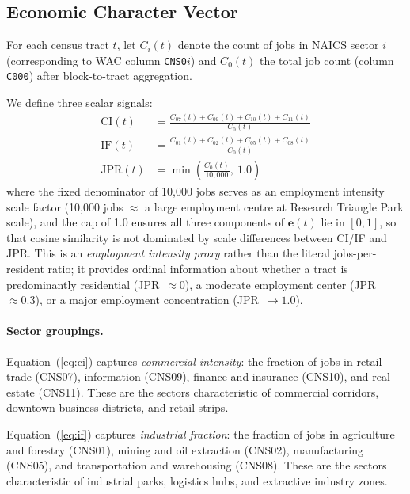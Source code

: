 \label{sec:algorithm}

\subsection{Economic Character Vector}

For each census tract $t$, let $C_{i}(t)$ denote the count of jobs in
NAICS sector $i$ (corresponding to WAC column \texttt{CNS0}$i$) and
$C_{0}(t)$ the total job count (column \texttt{C000}) after
block-to-tract aggregation.

We define three scalar signals:
\begin{align}
  \mathrm{CI}(t) &= \frac{C_{07}(t) + C_{09}(t) + C_{10}(t) + C_{11}(t)}{C_{0}(t)}
    \label{eq:ci} \\
  \mathrm{IF}(t) &= \frac{C_{01}(t) + C_{02}(t) + C_{05}(t) + C_{08}(t)}{C_{0}(t)}
    \label{eq:if} \\
  \mathrm{JPR}(t) &= \min\!\left(\frac{C_{0}(t)}{10{,}000},\ 1.0\right)
    \label{eq:jpr}
\end{align}
where the fixed denominator of 10,000 jobs serves as an employment intensity
scale factor (10,000 jobs $\approx$ a large employment centre at Research
Triangle Park scale), and the cap of 1.0 ensures all three components of
$\mathbf{e}(t)$ lie in $[0,1]$, so that cosine similarity is not dominated
by scale differences between CI/IF and JPR.
This is an \emph{employment intensity proxy} rather than the literal
jobs-per-resident ratio; it provides ordinal information about whether a tract
is predominantly residential (JPR~$\approx 0$), a moderate employment center
(JPR~$\approx 0.3$), or a major employment concentration
(JPR~$\rightarrow 1.0$).

\paragraph{Sector groupings.}
Equation~(\ref{eq:ci}) captures \emph{commercial intensity}: the fraction
of jobs in retail trade (CNS07), information (CNS09), finance and insurance
(CNS10), and real estate (CNS11).
These are the sectors characteristic of commercial corridors, downtown
business districts, and retail strips.

Equation~(\ref{eq:if}) captures \emph{industrial fraction}: the fraction
of jobs in agriculture and forestry (CNS01), mining and oil extraction
(CNS02), manufacturing (CNS05), and transportation and warehousing (CNS08).
These are the sectors characteristic of industrial parks, logistics hubs,
and extractive industry zones.

